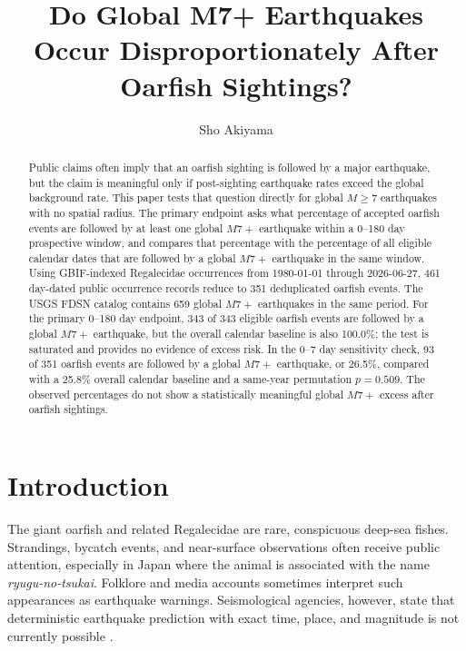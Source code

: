 \documentclass[sigconf,nonacm]{acmart}
\title{Do Global M7+ Earthquakes Occur Disproportionately After Oarfish Sightings?}
\author{Sho Akiyama}
\affiliation{%
  \institution{Independent Researcher}
  \city{Tokyo}
  \country{Japan}}
\begin{document}
\begin{abstract}
Public claims often imply that an oarfish sighting is followed by a major earthquake, but the claim is meaningful only if post-sighting earthquake rates exceed the global background rate. This paper tests that question directly for global $M \geq 7$ earthquakes with no spatial radius. The primary endpoint asks what percentage of accepted oarfish events are followed by at least one global $M7+$ earthquake within a 0--180 day prospective window, and compares that percentage with the percentage of all eligible calendar dates that are followed by a global $M7+$ earthquake in the same window. Using GBIF-indexed Regalecidae occurrences from 1980-01-01 through 2026-06-27, 461 day-dated public occurrence records reduce to 351 deduplicated oarfish events. The USGS FDSN catalog contains 659 global $M7+$ earthquakes in the same period. For the primary 0--180 day endpoint, 343 of 343 eligible oarfish events are followed by a global $M7+$ earthquake, but the overall calendar baseline is also 100.0\%; the test is saturated and provides no evidence of excess risk. In the 0--7 day sensitivity check, 93 of 351 oarfish events are followed by a global $M7+$ earthquake, or 26.5\%, compared with a 25.8\% overall calendar baseline and a same-year permutation $p=0.509$. The observed percentages do not show a statistically meaningful global $M7+$ excess after oarfish sightings.
\end{abstract}


\maketitle

\section{Introduction}
The giant oarfish and related Regalecidae are rare, conspicuous deep-sea fishes. Strandings, bycatch events, and near-surface observations often receive public attention, especially in Japan where the animal is associated with the name \emph{ryugu-no-tsukai}. Folklore and media accounts sometimes interpret such appearances as earthquake warnings. Seismological agencies, however, state that deterministic earthquake prediction with exact time, place, and magnitude is not currently possible \cite{usgs_prediction,jma_prediction}.
\end{document}
